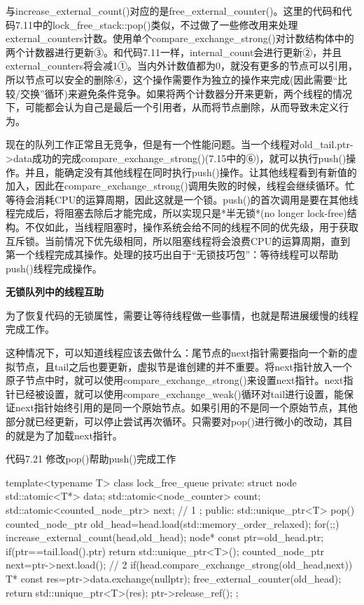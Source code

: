 与increase\_external\_count()对应的是free\_external\_counter()。这里的代码和代码7.11中的lock\_free\_stack::pop()类似，不过做了一些修改用来处理external\_counters计数。使用单个compare\_exchange\_strong()对计数结构体中的两个计数器进行更新③。和代码7.11一样，internal\_count会进行更新②，并且external\_counters将会减1①。当内外计数值都为0，就没有更多的节点可以引用，所以节点可以安全的删除④，这个操作需要作为独立的操作来完成(因此需要“比较/交换”循环)来避免条件竞争。如果将两个计数器分开来更新，两个线程的情况下，可能都会认为自己是最后一个引用者，从而将节点删除，从而导致未定义行为。

现在的队列工作正常且无竞争，但是有一个性能问题。当一个线程对old\_tail.ptr->data成功的完成compare\_exchange\_strong()(7.15中的⑥)，就可以执行push()操作。并且，能确定没有其他线程在同时执行push()操作。让其他线程看到有新值的加入，因此在compare\_exchange\_strong()调用失败的时候，线程会继续循环。忙等待会消耗CPU的运算周期，因此这就是一个锁。push()的首次调用是要在其他线程完成后，将阻塞去除后才能完成，所以实现只是*半无锁*(no longer lock-free)结构。不仅如此，当线程阻塞时，操作系统会给不同的线程不同的优先级，用于获取互斥锁。当前情况下优先级相同，所以阻塞线程将会浪费CPU的运算周期，直到第一个线程完成其操作。处理的技巧出自于“无锁技巧包”：等待线程可以帮助push()线程完成操作。

\textbf{无锁队列中的线程互助}

为了恢复代码的无锁属性，需要让等待线程做一些事情，也就是帮进展缓慢的线程完成工作。

这种情况下，可以知道线程应该去做什么：尾节点的next指针需要指向一个新的虚拟节点，且tail之后也要更新，虚拟节是谁创建的并不重要。将next指针放入一个原子节点中时，就可以使用compare\_exchange\_strong()来设置next指针。next指针已经被设置，就可以使用compare\_exchange\_weak()循环对tail进行设置，能保证next指针始终引用的是同一个原始节点。如果引用的不是同一个原始节点，其他部分就已经更新，可以停止尝试再次循环。只需要对pop()进行微小的改动，其目的就是为了加载next指针。

代码7.21 修改pop()帮助push()完成工作

\begin{cpp}
template<typename T>
class lock_free_queue
{
private:
  struct node
  {
    std::atomic<T*> data;
    std::atomic<node_counter> count;
    std::atomic<counted_node_ptr> next;  // 1
  };
public:
  std::unique_ptr<T> pop()
  {
    counted_node_ptr old_head=head.load(std::memory_order_relaxed);
    for(;;)
    {
      increase_external_count(head,old_head);
      node* const ptr=old_head.ptr;
      if(ptr==tail.load().ptr)
      {
        return std::unique_ptr<T>();
      }
      counted_node_ptr next=ptr->next.load();  // 2
      if(head.compare_exchange_strong(old_head,next))
      {
        T* const res=ptr->data.exchange(nullptr);
        free_external_counter(old_head);
        return std::unique_ptr<T>(res);
      }
      ptr->release_ref();
    }
  }
};
\end{cpp}

